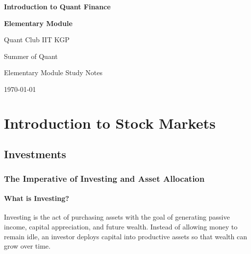 \documentclass[12pt,openany]{book}
\begin{document}
\begin{titlepage}
    \centering
    \vspace*{2cm}

    {\Huge \textbf{Introduction to Quant Finance}\par}
    \vspace{0.35cm}
    {\LARGE \textbf{Elementary Module}\par}
    \vspace{0.8cm}
    {\Large Quant Club IIT KGP\par}
    \vspace{0.4cm}
    {\Large Summer of Quant\par}

    \vfill

    {\large Elementary Module Study Notes\par}
    \vspace{0.5cm}
    {\large \today\par}

    \vfill
\end{titlepage}


\tableofcontents


\chapter{Introduction to Stock Markets}

\section{Investments}

\subsection{The Imperative of Investing and Asset Allocation}

\subsubsection{What is Investing?}
Investing is the act of purchasing assets with the goal of generating passive income, capital appreciation, and future wealth. Instead of allowing money to remain idle, an investor deploys capital into productive assets so that wealth can grow over time.
\end{document}
